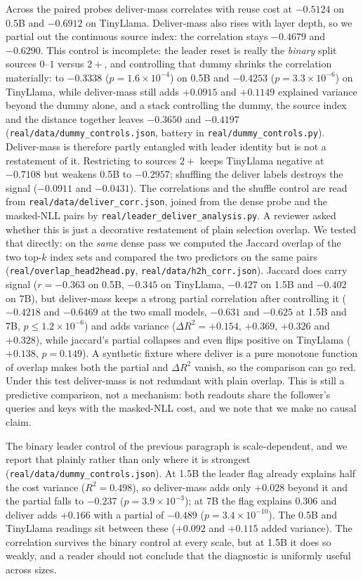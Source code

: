 \documentclass[10pt]{article}
\begin{document}
Across the paired probes deliver-mass correlates with reuse cost at $-0.5124$
on 0.5B and $-0.6912$ on TinyLlama. Deliver-mass also rises with layer depth,
so we partial out the continuous source index: the correlation stays $-0.4679$
and $-0.6290$. This control is incomplete: the leader reset is really the
\emph{binary} split sources $0$--$1$ versus $2+$, and controlling that dummy
shrinks the correlation materially: to $-0.3338$ ($p=1.6\times10^{-4}$) on
0.5B and $-0.4253$ ($p=3.3\times10^{-6}$) on TinyLlama, while deliver-mass
still adds $+0.0915$ and $+0.1149$ explained variance beyond the dummy alone,
and a stack controlling the dummy, the source index and the distance together
leaves $-0.3650$ and $-0.4197$ (\texttt{real/data/dummy\_controls.json},
battery in \texttt{real/dummy\_controls.py}). Deliver-mass is therefore partly
entangled with leader identity but is not a restatement of it. Restricting to
sources $2+$ keeps
TinyLlama negative at $-0.7108$ but weakens 0.5B to $-0.2957$; shuffling the
deliver labels destroys the signal ($-0.0911$ and $-0.0431$). The correlations
and the shuffle control are read from \texttt{real/data/deliver\_corr.json},
joined from the dense probe and the masked-NLL pairs by
\texttt{real/leader\_deliver\_analysis.py}. A reviewer asked whether this is
just a decorative restatement of plain selection overlap. We tested that
directly: on the \emph{same} dense pass we computed the Jaccard overlap of the
two top-$k$ index sets and compared the two predictors on the same pairs
(\texttt{real/overlap\_head2head.py}, \texttt{real/data/h2h\_corr.json}). Jaccard
does carry signal ($r=-0.363$ on 0.5B, $-0.345$ on TinyLlama, $-0.427$ on 1.5B
and $-0.402$ on 7B), but deliver-mass
keeps a strong partial correlation after controlling it ($-0.4218$ and
$-0.6469$ at the two small models, $-0.631$ and $-0.625$ at 1.5B and 7B,
$p\le1.2\times10^{-6}$) and adds variance ($\Delta R^2=+0.154$, $+0.369$,
$+0.326$ and $+0.328$), while jaccard's partial collapses and even flips
positive on
TinyLlama ($+0.138$, $p=0.149$). A synthetic fixture where deliver is a pure
monotone function of overlap makes both the partial and $\Delta R^2$ vanish, so
the comparison can go red. Under this test deliver-mass is not redundant with
plain overlap. This is still a predictive comparison, not a mechanism: both
readouts share the follower's queries and keys with the masked-NLL cost, and
we note that we make no causal claim.

The binary leader control of the previous paragraph is scale-dependent, and we
report that plainly rather than only where it is strongest
(\texttt{real/data/dummy\_controls.json}). At 1.5B the leader flag already
explains half the cost variance ($R^2=0.498$), so deliver-mass adds only
$+0.028$ beyond it and the partial falls to $-0.237$ ($p=3.9\times10^{-3}$);
at 7B the flag explains $0.306$ and deliver adds $+0.166$ with a partial of
$-0.489$ ($p=3.4\times10^{-10}$). The 0.5B and TinyLlama readings sit between
these ($+0.092$ and $+0.115$ added variance). The correlation survives the
binary control at every scale, but at 1.5B it does so weakly, and a reader
should not conclude that the diagnostic is uniformly useful across sizes.
\end{document}

